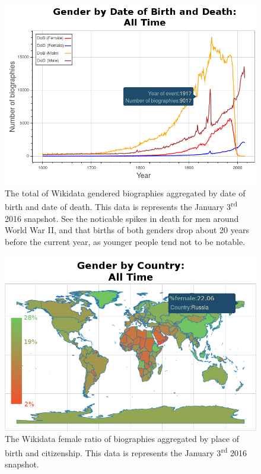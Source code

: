 \documentclass{sig-alternate-05-2015}
\begin{document}
\begin{figure}
\includegraphics[scale=0.31]{figures/genderbydob.png} 
\caption{The total of Wikidata gendered biographies aggregated by date of birth and date of death. This data is represents the January 3\textsuperscript{rd} 2016 snapshot. See the noticable spikes in death for men around World War II, and that births of both genders drop about 20 years before the current year, as younger people tend not to be notable.}
\label{fig:genderbydob}
\end{figure}

\begin{figure}
\includegraphics[scale=0.33]{figures/genderbycountry.png} 
\caption{The Wikidata female ratio of biographies aggregated by place of birth and citizenship. This data is represents the January 3\textsuperscript{rd} 2016 snapshot.}
\label{fig:genderbycountry}
\end{figure}
\end{document}

